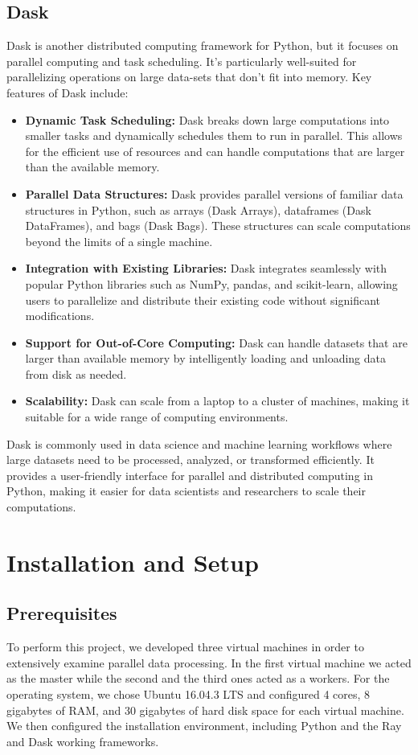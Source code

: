 \documentclass[conference]{IEEEtran}
\begin{document}
\subsection{Dask\cite{b7,b8}}
Dask is another distributed computing framework for Python, but it focuses on parallel computing and task scheduling. It's particularly well-suited for parallelizing operations on large data-sets that don't fit into memory. Key features of Dask include:
\begin{itemize}
\item \textbf{Dynamic Task Scheduling:} Dask breaks down large computations into smaller tasks and dynamically schedules them to run in parallel. This allows for the efficient use of resources and can handle computations that are larger than the available memory.
\item \textbf{Parallel Data Structures:} Dask provides parallel versions of familiar data structures in Python, such as arrays (Dask Arrays), dataframes (Dask DataFrames), and bags (Dask Bags). These structures can scale computations beyond the limits of a single machine.
\item \textbf{Integration with Existing Libraries:} Dask integrates seamlessly with popular Python libraries such as NumPy, pandas, and scikit-learn, allowing users to parallelize and distribute their existing code without significant modifications.
\item \textbf{Support for Out-of-Core Computing:} Dask can handle datasets that are larger than available memory by intelligently loading and unloading data from disk as needed.
\item \textbf{Scalability:} Dask can scale from a laptop to a cluster of machines, making it suitable for a wide range of computing environments.
\end{itemize}
Dask is commonly used in data science and machine learning workflows where large datasets need to be processed, analyzed, or transformed efficiently. It provides a user-friendly interface for parallel and distributed computing in Python, making it easier for data scientists and researchers to scale their computations.
\section{Installation and Setup}
\subsection{Prerequisites}
To perform this project, we developed three virtual machines in order to extensively examine parallel data processing. In the first virtual machine we acted as the master while the second and the third ones acted as a workers. For the operating system, we chose Ubuntu 16.04.3 LTS and configured 4 cores, 8 gigabytes of RAM, and 30 gigabytes of hard disk space for each virtual machine. We then configured the installation environment, including Python and the Ray and Dask working frameworks.
\end{document}
